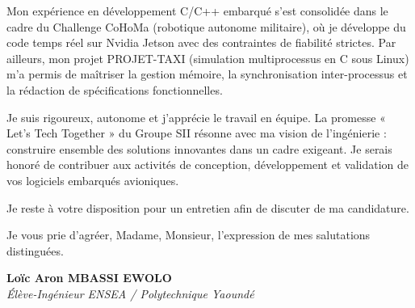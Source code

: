 \documentclass[a4paper,11pt]{article}
\begin{document}
Mon expérience en développement C/C++ embarqué s'est consolidée dans le cadre du Challenge CoHoMa (robotique autonome militaire), où je développe du code temps réel sur Nvidia Jetson avec des contraintes de fiabilité strictes. Par ailleurs, mon projet PROJET-TAXI (simulation multiprocessus en C sous Linux) m'a permis de maîtriser la gestion mémoire, la synchronisation inter-processus et la rédaction de spécifications fonctionnelles.

Je suis rigoureux, autonome et j'apprécie le travail en équipe. La promesse « Let's Tech Together » du Groupe SII résonne avec ma vision de l'ingénierie : construire ensemble des solutions innovantes dans un cadre exigeant. Je serais honoré de contribuer aux activités de conception, développement et validation de vos logiciels embarqués avioniques.

Je reste à votre disposition pour un entretien afin de discuter de ma candidature.

Je vous prie d'agréer, Madame, Monsieur, l'expression de mes salutations distinguées.

\vspace{0.8cm}

\textbf{Loïc Aron MBASSI EWOLO}\\
\textit{Élève-Ingénieur ENSEA / Polytechnique Yaoundé}
\end{document}
